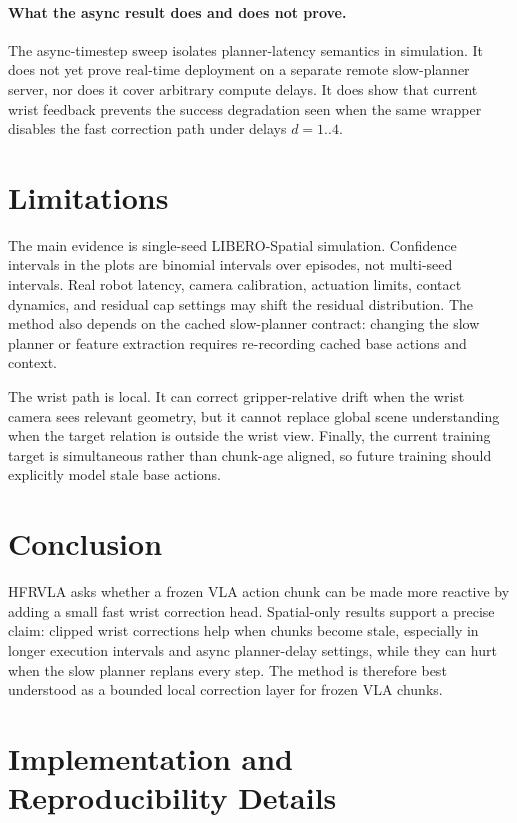 \documentclass[10pt]{article}
\newcommand{\method}{HFRVLA}
\begin{document}
\paragraph{What the async result does and does not prove.}
The async-timestep sweep isolates planner-latency semantics in simulation. It does not yet prove real-time deployment on a separate remote slow-planner server, nor does it cover arbitrary compute delays. It does show that current wrist feedback prevents the success degradation seen when the same wrapper disables the fast correction path under delays $d=1..4$.

\section{Limitations}

The main evidence is single-seed LIBERO-Spatial simulation. Confidence intervals in the plots are binomial intervals over episodes, not multi-seed intervals. Real robot latency, camera calibration, actuation limits, contact dynamics, and residual cap settings may shift the residual distribution. The method also depends on the cached slow-planner contract: changing the slow planner or feature extraction requires re-recording cached base actions and context.

The wrist path is local. It can correct gripper-relative drift when the wrist camera sees relevant geometry, but it cannot replace global scene understanding when the target relation is outside the wrist view. Finally, the current training target is simultaneous rather than chunk-age aligned, so future training should explicitly model stale base actions.

\section{Conclusion}

\method{} asks whether a frozen VLA action chunk can be made more reactive by adding a small fast wrist correction head. Spatial-only results support a precise claim: clipped wrist corrections help when chunks become stale, especially in longer execution intervals and async planner-delay settings, while they can hurt when the slow planner replans every step. The method is therefore best understood as a bounded local correction layer for frozen VLA chunks.

\appendix

\section{Implementation and Reproducibility Details}
\label{app:implementation-reproducibility}
\end{document}
